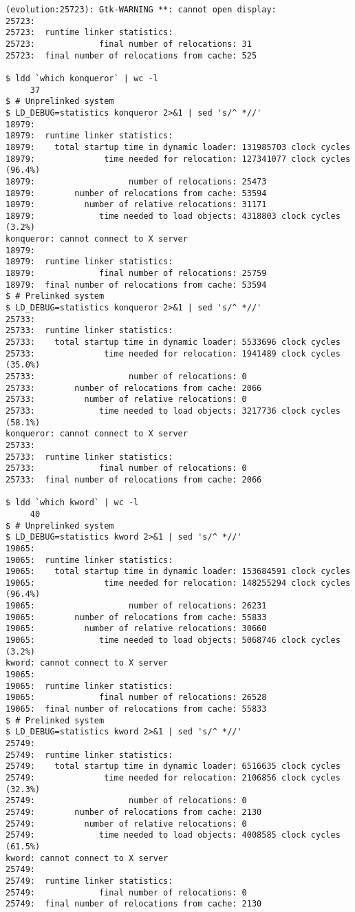 \documentclass[twoside]{article}
\begin{document}
{{\begin{verbatim}
(evolution:25723): Gtk-WARNING **: cannot open display:
25723:
25723:  runtime linker statistics:
25723:             final number of relocations: 31
25723:  final number of relocations from cache: 525

$ ldd `which konqueror` | wc -l
     37
$ # Unprelinked system
$ LD_DEBUG=statistics konqueror 2>&1 | sed 's/^ *//'
18979:
18979:  runtime linker statistics:
18979:    total startup time in dynamic loader: 131985703 clock cycles
18979:              time needed for relocation: 127341077 clock cycles (96.4%)
18979:                   number of relocations: 25473
18979:        number of relocations from cache: 53594
18979:          number of relative relocations: 31171
18979:             time needed to load objects: 4318803 clock cycles (3.2%)
konqueror: cannot connect to X server
18979:
18979:  runtime linker statistics:
18979:             final number of relocations: 25759
18979:  final number of relocations from cache: 53594
$ # Prelinked system
$ LD_DEBUG=statistics konqueror 2>&1 | sed 's/^ *//'
25733:
25733:  runtime linker statistics:
25733:    total startup time in dynamic loader: 5533696 clock cycles
25733:              time needed for relocation: 1941489 clock cycles (35.0%)
25733:                   number of relocations: 0
25733:        number of relocations from cache: 2066
25733:          number of relative relocations: 0
25733:             time needed to load objects: 3217736 clock cycles (58.1%)
konqueror: cannot connect to X server
25733:
25733:  runtime linker statistics:
25733:             final number of relocations: 0
25733:  final number of relocations from cache: 2066

$ ldd `which kword` | wc -l
     40
$ # Unprelinked system
$ LD_DEBUG=statistics kword 2>&1 | sed 's/^ *//'
19065:
19065:  runtime linker statistics:
19065:    total startup time in dynamic loader: 153684591 clock cycles
19065:              time needed for relocation: 148255294 clock cycles (96.4%)
19065:                   number of relocations: 26231
19065:        number of relocations from cache: 55833
19065:          number of relative relocations: 30660
19065:             time needed to load objects: 5068746 clock cycles (3.2%)
kword: cannot connect to X server
19065:
19065:  runtime linker statistics:
19065:             final number of relocations: 26528
19065:  final number of relocations from cache: 55833
$ # Prelinked system
$ LD_DEBUG=statistics kword 2>&1 | sed 's/^ *//'
25749:
25749:  runtime linker statistics:
25749:    total startup time in dynamic loader: 6516635 clock cycles
25749:              time needed for relocation: 2106856 clock cycles (32.3%)
25749:                   number of relocations: 0
25749:        number of relocations from cache: 2130
25749:          number of relative relocations: 0
25749:             time needed to load objects: 4008585 clock cycles (61.5%)
kword: cannot connect to X server
25749:
25749:  runtime linker statistics:
25749:             final number of relocations: 0
25749:  final number of relocations from cache: 2130
\end{verbatim}}
}
\end{document}
